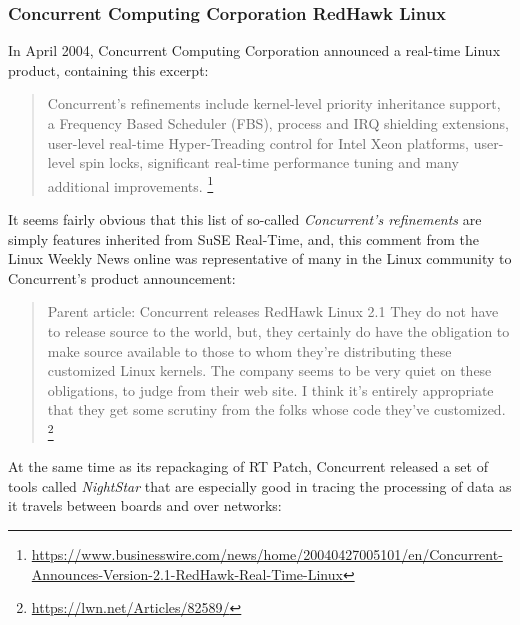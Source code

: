 \documentclass[12pt]{article}
\begin{document}
\subsubsection{Concurrent Computing Corporation RedHawk Linux}

In April 2004, Concurrent Computing Corporation announced a real-time
Linux product, containing this excerpt:

\begin{quote}
Concurrent's refinements include kernel-level priority inheritance support,
a Frequency Based Scheduler (FBS), process and IRQ shielding extensions,
user-level real-time Hyper-Treading control for Intel Xeon platforms,
user-level spin locks, significant real-time performance tuning and
many additional improvements.%
\footnote{\url{https://www.businesswire.com/news/home/20040427005101/en/Concurrent-Announces-Version-2.1-RedHawk-Real-Time-Linux}}
\end{quote}

It seems fairly obvious that this list of so-called \emph{Concurrent's refinements}
are simply features inherited from SuSE Real-Time, and, this comment from the Linux
Weekly News online was representative of many in the Linux community to
Concurrent's product announcement:

\begin{quote}
Parent article: Concurrent releases RedHawk Linux 2.1
They do not have to release source to the world, but,
they certainly do have the obligation to make source
available to those to whom they're distributing these
customized Linux kernels. The company seems to be very quiet on these
obligations, to judge from their web site. I think it's entirely
appropriate that they get some scrutiny from the folks
whose code they've customized.%
\footnote{\url{https://lwn.net/Articles/82589/}}
\end{quote}

At the same time as its repackaging of RT Patch, Concurrent released a set of
tools called \emph{NightStar} that are especially good in tracing the processing
of data as it travels between boards and over networks:
\end{document}
